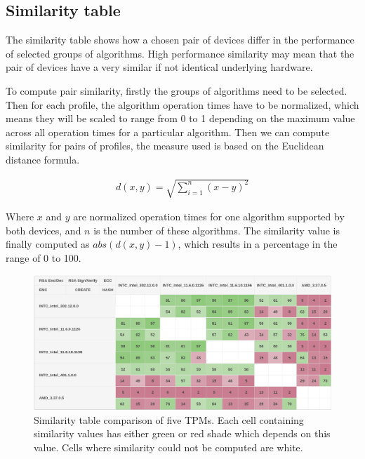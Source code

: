 \subsection{Similarity table}
The similarity table shows how a chosen pair of devices differ in the performance of selected groups of algorithms. High performance similarity may mean that the pair of devices have a very similar if not identical underlying hardware.

To compute pair similarity, firstly the groups of algorithms need to be selected. Then for each profile, the algorithm operation times have to be normalized, which means they will be scaled to range from 0 to 1 depending on the maximum value across all operation times for a particular algorithm. Then we can compute similarity for pairs of profiles, the measure used is based on the Euclidean distance formula.


\begin{align*}
    d(x, y) = \sqrt{\sum_{i=1}^{n}(x - y)^{2}} 
\end{align*}

Where $x$ and $y$ are normalized operation times for one algorithm supported by both devices, and $n$ is the number of these algorithms. The similarity value is finally computed as $abs(d(x, y) - 1)$, which results in a percentage in the range of 0 to 100.

\begin{figure}[!tbp]
    \centering
    \includegraphics[width=\textwidth]{img/visualizations/tpm-similarity-intext.png}
    \caption{Similarity table comparison of five TPMs. Each cell containing similarity values has either green or red shade which depends on this value. Cells where similarity could not be computed are white.}
    \label{fig:simtable-intext}
\end{figure}




